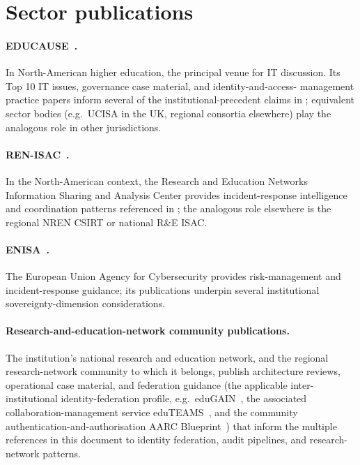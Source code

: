 \section{Sector publications}
\label{sec:er-sector}

\paragraph{EDUCAUSE~\cite{educause-top10}.} In North-American
higher education, the principal venue for IT discussion. Its Top 10 IT
issues, governance case material, and identity-and-access-
management practice papers inform several of the
institutional-precedent claims in
; equivalent sector bodies
(e.g.\ UCISA in the UK, regional consortia elsewhere) play the
analogous role in other jurisdictions.

\paragraph{REN-ISAC~\cite{ren-isac}.} In the North-American context,
the Research and Education Networks Information Sharing and Analysis
Center provides incident-response intelligence and coordination
patterns referenced in ; the analogous
role elsewhere is the regional NREN CSIRT or national R\&E ISAC.

\paragraph{ENISA~\cite{enisa-risk}.} The European Union Agency
for Cybersecurity provides risk-management and incident-response
guidance; its publications underpin several institutional
sovereignty-dimension considerations.

\paragraph{Research-and-education-network community publications.}
The institution's national research and education network, and the
regional research-network community to which it belongs, publish
architecture reviews, operational case material, and federation
guidance (the applicable inter-institutional identity-federation
profile, e.g.\ eduGAIN~\cite{edugain}, the associated
collaboration-management service eduTEAMS~\cite{eduteams}, and the
community authentication-and-authorisation AARC
Blueprint~\cite{aarc-blueprint})
that inform the multiple references in this document to identity
federation, audit pipelines, and research-network patterns.


